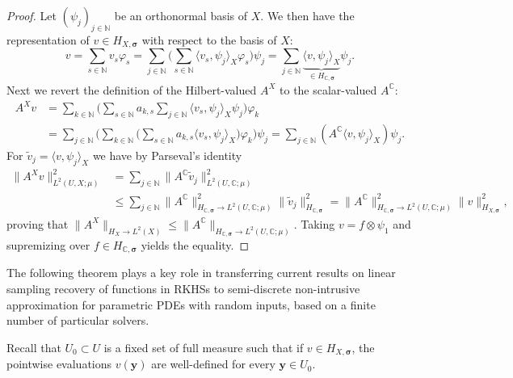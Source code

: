 \documentclass[11pt]{article}
\numberwithin{equation}{section}
\theoremstyle{definition}
\theoremstyle{remark}
\newcommand{\brac}[1]{\left(#1\right)}
\newcommand{\by}{{\boldsymbol{y}}}
\newcommand{\bsigma}{{\boldsymbol{\sigma}}}
\def\NN{{\mathbb N}}
\def\CC{{\mathbb C}}
\def\CC{{\mathbb C}}
\def\NN{{\mathbb N}}
\def\CC{{\mathbb C}}
\def\NN{{\mathbb N}}
\begin{document}
\begin{proof}
    Let $\brac{\psi_j}_{j \in \NN}$ be an orthonormal basis of $X$.
    We then have the representation of $v\in H_{X,\bsigma}$ with respect to the basis of $X$:
    \begin{equation*}
        v
        = \sum_{s\in\NN} v_s \varphi_s
        = \sum_{j\in\NN} \Big(\sum_{s\in\NN} \langle v_s, \psi_j\rangle_X \varphi_s\Big) \psi_j
        = \sum_{j\in\NN} \underbrace{\langle v, \psi_j\rangle_X}_{\in H_{\CC,\bsigma}} \psi_j .
    \end{equation*}
    Next we revert the definition of the Hilbert-valued $A^X$ to the scalar-valued $A^\CC$:
    \begin{align*}
        A^Xv
        &= \sum_{k\in\NN} \Big(\sum_{s\in\NN} a_{k,s} \sum_{j\in\NN} \langle v_s, \psi_j\rangle_X \psi_j \Big) \varphi_k \\
        &= \sum_{j\in\NN} \Big( \sum_{k\in\NN}  \Big(\sum_{s\in\NN} a_{k,s} \langle v_s, \psi_j\rangle_X \Big) \varphi_{k} \Big) \psi_j
        = \sum_{j\in\NN} (A^\CC \langle v, \psi_j\rangle_X) \psi_j .
      \end{align*}
      For $\tilde v_j = \langle v,\psi_j\rangle_X$ we have by Parseval's identity
    \begin{align*}
        \|A^Xv\|_{L^2(U, X; \mu)}^2
        &= \sum_{j\in\mathbb N}\|A^{\CC}\tilde v_j\|_{L^2(U, \CC; \mu)}^2 \\
        &\le\sum_{j\in\mathbb N}\|A^{\CC}\|_{H_{\CC,\bsigma}\to L^2(U,\CC;\mu)}^2 \|\tilde v_j\|_{H_{\CC,\bsigma}}^2 
        = \|A^{\CC}\|_{H_{\CC,\bsigma}\to L^2(U, \CC; \mu)}^2\|v\|_{H_{X,\bsigma}}^2,
    \end{align*}
    proving that $\|A^X\|_{H_X\to L^2(X)} \le \|A^{\CC}\|_{H_{\CC,\bsigma}\to L^2(U,\CC;\mu)}$.
    Taking $v=f \otimes \psi_1$ and supremizing over $f\in H_{\CC,\bsigma}$ yields the equality.
    \hfill
\end{proof}


The following theorem plays a key role in transferring current results on linear sampling recovery of functions in RKHSs \cite{BSU23, DKU2023,KUV21,KU21a} to semi-discrete non-intrusive approximation for parametric PDEs with random inputs, based on a finite number of particular solvers.

{Recall that $U_0 \subset U$ is a fixed set of full measure such  that if $v \in H_{X,\bsigma}$, the pointwise evaluations  $v(\by)$ are  well-defined for every $\by \in U_0$.}
\end{document}
